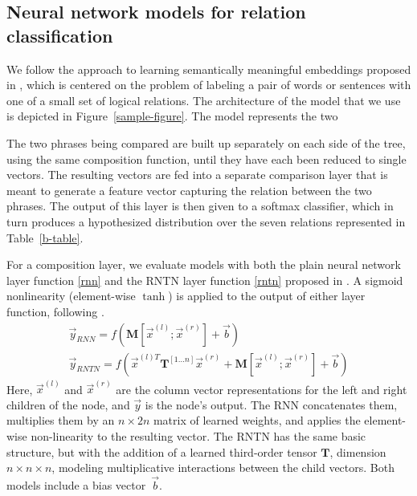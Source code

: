 
\subsection*{Neural network models for relation classification} \label{methods}


We follow the approach to learning semantically meaningful embeddings 
proposed in \cite{bowman2013can}, which is centered on the problem of
labeling a pair of words or sentences with one of a small set of logical
relations. The architecture of the model that we use is depicted in
Figure~\ref{sample-figure}. The model represents the two 


The two phrases being compared
are built up separately on each side of the tree, using the same
composition function, until they have each been reduced to single
vectors. The resulting vectors are fed into a separate comparison
layer that is meant to generate a feature vector capturing the
relation between the two phrases. The output of this layer is then
given to a softmax classifier, which in turn produces a hypothesized
distribution over the seven relations represented in Table~\ref{b-table}.


For a composition layer, we evaluate models with both the plain neural
network layer function \eqref{rnn} and the RNTN layer function
\eqref{rntn} proposed in \citet{chen2013learning}. A sigmoid
nonlinearity (element-wise $\tanh$) is applied to the output of either
layer function, following \cite{socher2013acl1}.
%
\begin{gather} \label{rnn}
\vec{y}_{\textit{RNN}} = f(\mathbf{M} [\vec{x}^{(l)}; \vec{x}^{(r)}] + \vec{b}) \\ %
\label{rntn}
\vec{y}_{\textit{RNTN}} = f(\vec{x}^{(l)T} \mathbf{T}^{[1 \ldots n]} \vec{x}^{(r)} + \mathbf{M} [\vec{x}^{(l)}; \vec{x}^{(r)}] + \vec{b})
\end{gather} 
%
Here, $\vec{x}^{(l)}$ and $\vec{x}^{(r)}$ are the column vector
representations for the left and right children of the node, and
$\vec{y}$ is the node's output.  The RNN concatenates them, multiplies
them by an $n \times 2n$ matrix of learned weights, and applies the
element-wise non-linearity to the resulting vector. The RNTN has the
same basic structure, but with the addition of a learned third-order
tensor $\mathbf{T}$, dimension $n \times n \times n$, modeling
multiplicative interactions between the child vectors. Both models
include a bias vector~$\vec{b}$.

